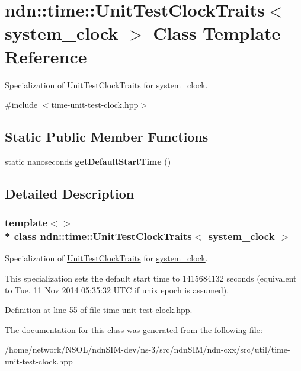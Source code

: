 \hypertarget{classndn_1_1time_1_1UnitTestClockTraits_3_01system__clock_01_4}{}\section{ndn\+:\+:time\+:\+:Unit\+Test\+Clock\+Traits$<$ system\+\_\+clock $>$ Class Template Reference}
\label{classndn_1_1time_1_1UnitTestClockTraits_3_01system__clock_01_4}


Specialization of \hyperlink{classndn_1_1time_1_1UnitTestClockTraits}{Unit\+Test\+Clock\+Traits} for \hyperlink{classndn_1_1time_1_1system__clock}{system\+\_\+clock}.  




{\ttfamily \#include $<$time-\/unit-\/test-\/clock.\+hpp$>$}

\subsection*{Static Public Member Functions}
\begin{DoxyCompactItemize}
\item 
static nanoseconds {\bfseries get\+Default\+Start\+Time} ()\hypertarget{classndn_1_1time_1_1UnitTestClockTraits_3_01system__clock_01_4_afe7ecd975a796347c8548e336468a5d0}{}\label{classndn_1_1time_1_1UnitTestClockTraits_3_01system__clock_01_4_afe7ecd975a796347c8548e336468a5d0}

\end{DoxyCompactItemize}


\subsection{Detailed Description}
\subsubsection*{template$<$$>$\\*
class ndn\+::time\+::\+Unit\+Test\+Clock\+Traits$<$ system\+\_\+clock $>$}

Specialization of \hyperlink{classndn_1_1time_1_1UnitTestClockTraits}{Unit\+Test\+Clock\+Traits} for \hyperlink{classndn_1_1time_1_1system__clock}{system\+\_\+clock}. 

This specialization sets the default start time to 1415684132 seconds (equivalent to Tue, 11 Nov 2014 05\+:35\+:32 U\+TC if unix epoch is assumed). 

Definition at line 55 of file time-\/unit-\/test-\/clock.\+hpp.



The documentation for this class was generated from the following file\+:\begin{DoxyCompactItemize}
\item 
/home/network/\+N\+S\+O\+L/ndn\+S\+I\+M-\/dev/ns-\/3/src/ndn\+S\+I\+M/ndn-\/cxx/src/util/time-\/unit-\/test-\/clock.\+hpp\end{DoxyCompactItemize}
